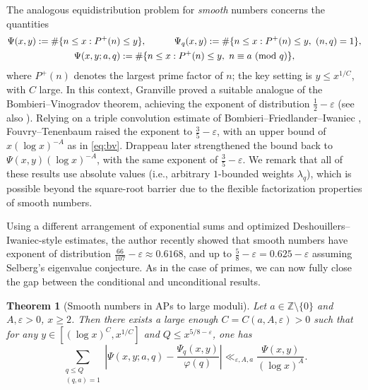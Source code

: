 \documentclass[reqno,11pt]{amsart}
\newtheorem{theorem}{Theorem}[section]
\theoremstyle{remark}
\numberwithin{equation}{section}
\newcommand{\Z}{\mathbb{Z}}
\newcommand{\eps}{\varepsilon}
\renewcommand{\pmod}[1]{\ (\textnormal{mod } #1)}
\begin{document}
The analogous equidistribution problem for \emph{smooth} numbers \cite{fouvry1996repartition,drappeau2015theoremes} concerns the quantities
\begin{equation} \label{eq:smooth-notations}
\begin{gathered}
    \Psi(x, y) := \# \{n \le x : P^+(n) \le y\},
    \qquad\quad 
    \Psi_q(x, y) := \# \{n \le x : P^+(n) \le y,\ (n, q) = 1\},
    \\
    \Psi(x, y; a, q) := \# \{n \le x : P^+(n) \le y,\ n \equiv a \pmod{q}\},
\end{gathered}
\end{equation}
where $P^+(n)$ denotes the largest prime factor of $n$; the key setting is $y \le x^{1/C}$, with $C$ large. In this context, Granville \cite[Theorem 2]{granville1993integers} proved a suitable analogue of the Bombieri--Vinogradov theorem, achieving the exponent of distribution $\tfrac{1}{2}-\eps$ (see also \cite{wolke1973mittlereI,wolke1973mittlereII,fouvry1991entiers,granville1993integers2}). Relying on a triple convolution estimate of Bombieri--Friedlander--Iwaniec \cite[Theorem 4]{bombieri1986primes}, Fouvry--Tenenbaum \cite{fouvry1996repartition} raised the exponent to $\tfrac{3}{5}-\eps$, with an upper bound of $x (\log x)^{-A}$ as in \cref{eq:bv}. Drappeau later \cite{drappeau2015theoremes} strengthened the bound back to $\Psi(x, y)(\log x)^{-A}$, with the same exponent of $\tfrac{3}{5}-\eps$. We remark that all of these results use absolute values (i.e., arbitrary $1$-bounded weights $\lambda_q$), which is possible beyond the square-root barrier due to the flexible factorization properties of smooth numbers.

Using a different arrangement of exponential sums and optimized Deshouillers--Iwaniec-style estimates, the author \cite{pascadi2023smooth} recently showed that smooth numbers have exponent of distribution $\tfrac{66}{107} - \eps \approx 0.6168$, and up to $\tfrac{5}{8} - \eps = 0.625 - \eps$ assuming Selberg's eigenvalue conjecture. 
As in the case of primes, we can now fully close the gap between the conditional and unconditional results.

\begin{theorem}[Smooth numbers in APs to large moduli]
\label{thm:smooth}
Let $a \in \Z \setminus \{0\}$ and $A, \eps > 0$, $x \ge 2$. Then there exists a large enough $C = C(a, A, \eps) > 0$ such that for any $y \in [(\log x)^C, x^{1/C}]$ and $Q \le x^{5/8 - \eps}$, one has
\[
    \sum_{\substack{q \le Q \\ (q, a) = 1}}
    \left\vert 
    \Psi(x, y; a, q) - 
    \frac{\Psi_q(x, y)}{\varphi(q)} \right\vert 
    \ll_{\eps,A,a} 
    \frac{\Psi(x, y)}{(\log x)^A}.
\]
\end{theorem}
\end{document}
